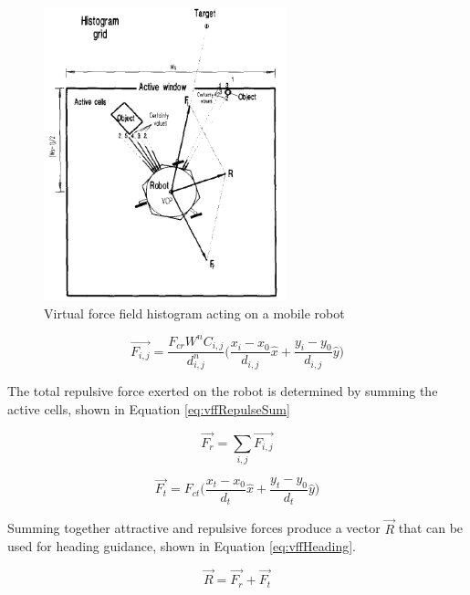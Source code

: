 \documentclass[numbered,pdftex]{ohio-etd}
\begin{document}
\begin{figure}[H]
	\centering
	\includegraphics[width=7cm]{PaperFigures/histogram}
	\caption{Virtual force field histogram acting on a mobile robot \cite{borenstein_vector_1991}}
	\label{fig:histogram}
\end{figure}

\begin{equation}\label{eq:vffRepulse}
\overrightarrow{F_{i,j}} = \frac{F_{cr}W^nC_{i,j}}{d^n_{i,j}} \bigg( \frac{x_i-x_0}{d_{i,j}}\hat{x} + \frac{y_i-y_0}{d_{i,j}}\hat{y}\bigg)
\end{equation}

\noindent
The total repulsive force exerted on the robot is determined by summing the active cells, shown in Equation \ref{eq:vffRepulseSum}


\begin{equation}\label{eq:vffRepulseSum}
\overrightarrow{F_r} = \sum_{i,j}\overrightarrow{F_{i,j}}
\end{equation}


\begin{equation}\label{eq:vffGoal}
\overrightarrow{F_t} = F_{ct} \bigg( \frac{x_t-x_0}{d_{t}}\hat{x} + \frac{y_t-y_0}{d_{t}}\hat{y}\bigg)
\end{equation}

\noindent
Summing together attractive and repulsive forces produce a vector $\overrightarrow{R}$ that can be used for heading guidance, shown in Equation \ref{eq:vffHeading}.

\begin{equation}\label{eq:vffHeading}
\overrightarrow{R} = \overrightarrow{F_r} + \overrightarrow{F_t}
\end{equation}
\end{document}
